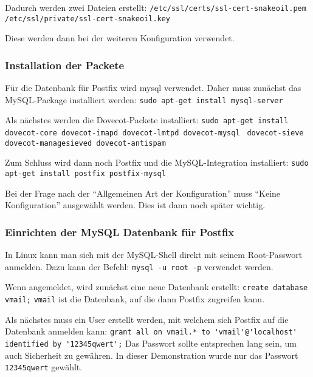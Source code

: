 Dadurch werden zwei Dateien erstellt: \newline
\verb|/etc/ssl/certs/ssl-cert-snakeoil.pem| \newline
\verb|/etc/ssl/private/ssl-cert-snakeoil.key| \newline

Diese werden dann bei der weiteren Konfiguration verwendet.

\subsubsection{Installation der Packete}

Für die Datenbank für Postfix wird mysql verwendet. Daher muss zunächst das MySQL-Package installiert werden:\newline
\verb|sudo apt-get install mysql-server|

Als nächstes werden die Dovecot-Packete installiert:\newline
\verb|sudo apt-get install dovecot-core dovecot-imapd dovecot-lmtpd dovecot-mysql |\newline
\verb|dovecot-sieve dovecot-managesieved dovecot-antispam|\newline

Zum Schluss wird dann noch Postfix und die MySQL-Integration installiert: \newline
\verb|sudo apt-get install postfix postfix-mysql|

Bei der Frage nach der ``Allgemeinen Art der Konfiguration'' muss ``Keine Konfiguration'' ausgewählt werden. Dies ist dann noch später wichtig.

\subsubsection{Einrichten der MySQL Datenbank für Postfix}
In Linux kann man sich mit der MySQL-Shell direkt mit seinem Root-Passwort anmelden. Dazu kann der Befehl:\newline
\verb|mysql -u root -p|\newline
verwendet werden.

Wenn angemeldet, wird zunächst eine neue Datenbank erstellt:\newline
\verb|create database vmail;|\newline
\verb|vmail| ist die Datenbank, auf die dann Postfix zugreifen kann.

Als nächstes muss ein User erstellt werden, mit welchem sich Postfix auf die Datenbank anmelden kann:\newline
\verb|grant all on vmail.* to 'vmail'@'localhost' identified by '12345qwert';|\newline
Das Passwort sollte entsprechen lang sein, um auch Sicherheit zu gewähren. In dieser Demonstration wurde nur das Passwort \verb|12345qwert| gewählt.


